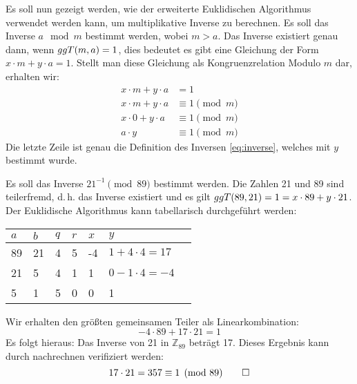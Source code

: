 \noindent
Es soll nun gezeigt werden, wie der erweiterte Euklidischen Algorithmus verwendet werden kann,
um multiplikative Inverse zu berechnen. Es soll das Inverse $a \mod{m}$ bestimmt werden, wobei
$m > a$. Das Inverse existiert genau dann, wenn $ggT(m,a) = 1$, dies bedeutet es gibt
eine Gleichung der Form $x \cdot m + y \cdot a = 1$. Stellt man diese Gleichung
als Kongruenzrelation Modulo $m$ dar, erhalten wir:
\begin{align*}
  x \cdot m + y \cdot a & = 1               \\
  x \cdot m + y \cdot a & \equiv 1 \pmod{m} \\
  x \cdot 0 + y \cdot a & \equiv 1 \pmod{m} \\
  a \cdot y             & \equiv 1 \pmod{m}
\end{align*}
Die letzte Zeile ist genau die Definition des Inversen \eqref{eq:inverse}, welches
mit $y$ bestimmt wurde.
\begin{example}
  Es soll das Inverse $21^{-1} \pmod{89}$ bestimmt werden. Die Zahlen 21 und 89 sind
  teilerfremd, d.\,h. das Inverse existiert und es gilt
  $ggT(89,21) = 1 = x \cdot 89 + y \cdot 21$. Der Euklidische
  Algorithmus kann tabellarisch durchgeführt werden:
  \begin{center}
    \centering
    \begin{tabular}{|l|l|l|l|l|l|l|}
      \hline
      $a$ & $b$ & $q$ & $r$ & $x$ & $y$                  \\ \hline
      89  & 21  & 4   & 5   & -4  & $1 + 4 \cdot 4 = 17$ \\ \hline
      21  & 5   & 4   & 1   & 1   & $0 - 1 \cdot 4 = -4$ \\ \hline
      5   & 1   & 5   & 0   & 0   & 1                    \\ \hline
    \end{tabular}
  \end{center}
  \noindent
  Wir erhalten den größten gemeinsamen Teiler als Linearkombination:
  \begin{equation*}
    -4 \cdot 89 + 17 \cdot 21 = 1
  \end{equation*}
  Es folgt hieraus: Das Inverse von 21 in $\mathbb{Z}_{89}$ beträgt 17. Dieses Ergebnis kann durch nachrechnen
  verifiziert werden:
  \begin{equation*}
    17 \cdot 21 = 357 \equiv 1 \pmod{89} \qedhere
  \end{equation*}
\end{example}

